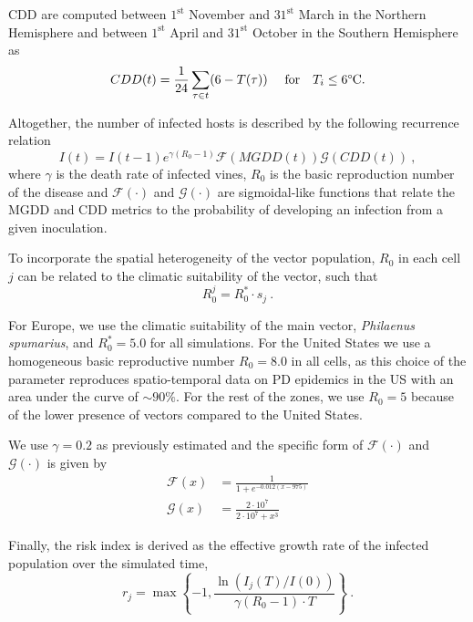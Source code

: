 CDD are computed between $1^{\mathrm{st}}$ November and $31^{\mathrm{st}}$
March in the Northern Hemisphere and between $1^{\mathrm{st}}$ April and
$31^{\mathrm{st}}$ October in the Southern Hemisphere as
\begin{equation*}
    CDD(t)= \frac{1}{24}\sum_{\tau \in t} (6-T(\tau)) \ \quad \textrm{for}
    \quad T_i\le 6\textrm{\textdegree C} .
\end{equation*}

Altogether, the number of infected hosts is described by the following
recurrence relation
\begin{equation*}
    I(t)=I(t-1)e^{\gamma(R_0-1)}\mathcal{F}(MGDD(t))\mathcal{G}(CDD(t)) \ ,
\end{equation*}
where $\gamma$ is the death rate of infected vines, $R_0$ is the basic
reproduction number of the disease and $\mathcal{F}(\cdot)$ and
$\mathcal{G}(\cdot)$ are sigmoidal-like functions that relate the MGDD and CDD
metrics to the probability of developing an infection from a given inoculation.

To incorporate the spatial heterogeneity of the vector population, $R_0$ in
each cell $j$ can be related to the climatic suitability of the vector, such
that
\begin{equation*}
    R_0^j=R_0^*\cdot s_j \ .
\end{equation*}

For Europe, we use the climatic suitability of the main vector,
\textit{Philaenus spumarius}, and $R_0^*=5.0$ for all simulations. For the
United States we use a homogeneous basic reproductive number $R_0=8.0$ in all
cells, as this choice of the parameter reproduces spatio-temporal data on PD
epidemics in the US with an area under the curve of $\sim 90\%$. For the rest
of the zones, we use $R_0=5$ because of the lower presence of vectors compared
to the United States.

We use $\gamma=0.2$ as previously estimated \cite{Almeida2003} and the
specific form of $\mathcal{F}(\cdot)$ and $\mathcal{G}(\cdot)$ is given by
\begin{align}
    \mathcal{F}(x) & = \frac{1}{1+e^{-0.012(x-975)}}        \\
    \mathcal{G}(x) & = \frac{2\cdot10^7}{2\cdot 10^7 + x^3}
\end{align}

Finally, the risk index is derived as the effective growth rate of the
infected population over the simulated time,
\begin{equation}
    r_j=\max\left\{-1, \frac{\ln(I_j(T) / I(0))}{\gamma(R_0-1)\cdot
        T}\right\} \ .
\end{equation}

